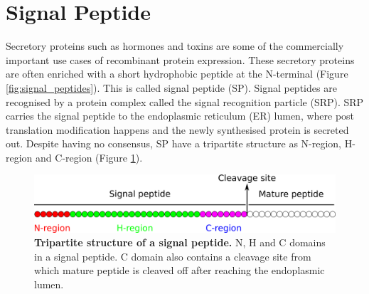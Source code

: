 \section{Signal Peptide}
Secretory proteins such as hormones and toxins are some of the commercially important use cases of recombinant protein expression. These secretory proteins are often enriched with a short hydrophobic peptide at the N-terminal (Figure \ref{fig:signal_peptides}). This is called signal peptide (SP). Signal peptides are recognised by a protein complex called the signal recognition particle (SRP). SRP carries the signal peptide to the endoplasmic reticulum (ER) lumen, where post translation modification happens and the newly synthesised protein is secreted out.  Despite having no consensus, SP have a tripartite structure as N-region, H-region and C-region (Figure \ref{fig:signal_peptide_structure}). 

\begin{figure}[htbp!]
\center
\includegraphics[width=1\textwidth]{chapters/Introduction/SignalPeptide/Figures/signal_peptide.png}
\caption[Tripartite structure of a signal peptide.]{\textbf{Tripartite structure of a signal peptide.} N, H and C domains in a signal peptide. C domain also contains a cleavage site from which mature peptide is cleaved off after reaching the endoplasmic lumen. }
\label{fig:signal_peptide_structure}
\end{figure}


